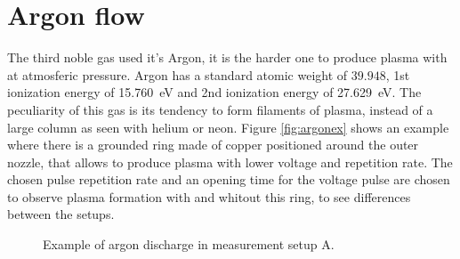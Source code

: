 \section{Argon flow}
The third noble gas used it's Argon, it is the harder one to produce plasma with at atmosferic pressure.
Argon has a standard atomic weight of $\num{39.948}$, 1st ionization energy of \SI{15.760}{\electronvolt} and 2nd ionization energy of \SI{27.629}{\electronvolt}.
The peculiarity of this gas is its tendency to form filaments of plasma, instead of a large column as seen with helium or neon. Figure \ref{fig:argonex} shows an example where there is a grounded ring made of copper positioned around the outer nozzle, that allows to produce plasma with lower voltage and repetition rate. The chosen pulse repetition rate and an opening time for the voltage pulse are chosen to observe plasma formation with and whitout this ring, to see differences between the setups.
\begin{figure}
 \centering
 \hfill
 \caption{Example of argon discharge in measurement setup A.}
 \label{fig:elio_ins}
\end{figure}



